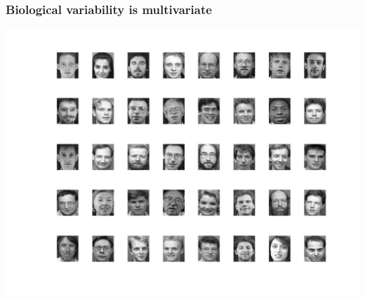 \begin{frame}
\frametitle{Biological variability is multivariate}
\begin{center}
\includegraphics[height=0.7\textwidth]{faces}
\end{center}
\end{frame}




